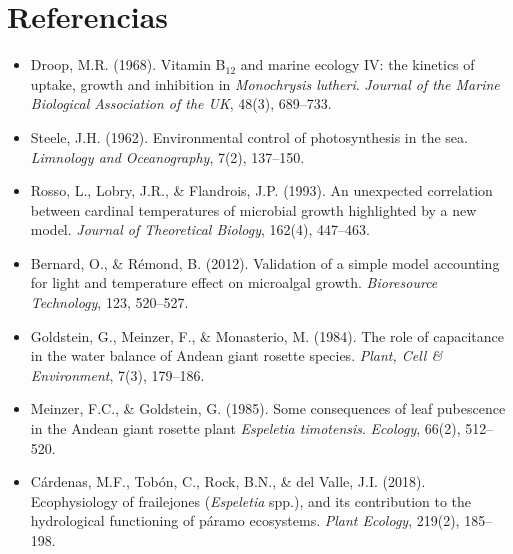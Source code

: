 \documentclass[11pt,a4paper]{article}
\begin{document}
\section*{Referencias}
\begin{itemize}
\item Droop, M.R. (1968). Vitamin B$_{12}$ and marine ecology IV: the kinetics of uptake, growth and inhibition in \textit{Monochrysis lutheri}. \textit{Journal of the Marine Biological Association of the UK}, 48(3), 689--733.
\item Steele, J.H. (1962). Environmental control of photosynthesis in the sea. \textit{Limnology and Oceanography}, 7(2), 137--150.
\item Rosso, L., Lobry, J.R., \& Flandrois, J.P. (1993). An unexpected correlation between cardinal temperatures of microbial growth highlighted by a new model. \textit{Journal of Theoretical Biology}, 162(4), 447--463.
\item Bernard, O., \& Rémond, B. (2012). Validation of a simple model accounting for light and temperature effect on microalgal growth. \textit{Bioresource Technology}, 123, 520--527.
\item Goldstein, G., Meinzer, F., \& Monasterio, M. (1984). The role of capacitance in the water balance of Andean giant rosette species. \textit{Plant, Cell \& Environment}, 7(3), 179--186.
\item Meinzer, F.C., \& Goldstein, G. (1985). Some consequences of leaf pubescence in the Andean giant rosette plant \textit{Espeletia timotensis}. \textit{Ecology}, 66(2), 512--520.
\item Cárdenas, M.F., Tobón, C., Rock, B.N., \& del Valle, J.I. (2018). Ecophysiology of frailejones (\textit{Espeletia} spp.), and its contribution to the hydrological functioning of páramo ecosystems. \textit{Plant Ecology}, 219(2), 185--198.
\end{itemize}
\end{document}
